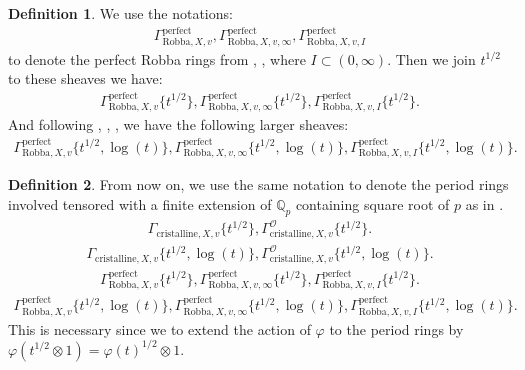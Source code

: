 \documentclass[12pt]{book}
\theoremstyle{definition}
\newtheorem{definition}{Definition}
\begin{document}
\begin{definition}
We use the notations:
\begin{align}
\Gamma^\mathrm{perfect}_{\text{Robba},X,v},\Gamma^\mathrm{perfect}_{\text{Robba},X,v,\infty},\Gamma^\mathrm{perfect}_{\text{Robba},X,v,I}
\end{align}
to denote the perfect Robba rings from \cite{KL1}, \cite{KL2}, where $I\subset (0,\infty)$. Then we join $t^{1/2}$ to these sheaves we have:
\begin{align}
\Gamma^\mathrm{perfect}_{\text{Robba},X,v}\{t^{1/2}\},\Gamma^\mathrm{perfect}_{\text{Robba},X,v,\infty}\{t^{1/2}\},\Gamma^\mathrm{perfect}_{\text{Robba},X,v,I}\{t^{1/2}\}.
\end{align}
And following \cite{BL1}, \cite{BL2}, \cite{Fon1}, \cite{BHS} we have the following larger sheaves:
\begin{align}
\Gamma^\mathrm{perfect}_{\text{Robba},X,v}\{t^{1/2},\log(t)\},\Gamma^\mathrm{perfect}_{\text{Robba},X,v,\infty}\{t^{1/2},\log(t)\},\Gamma^\mathrm{perfect}_{\text{Robba},X,v,I}\{t^{1/2},\log(t)\}.
\end{align} 
\end{definition}



\begin{definition}
From now on, we use the same notation to denote the period rings involved tensored with a finite extension of $\mathbb{Q}_p$ containing square root of $p$ as in \cite{BS}.
\begin{align}
\Gamma_{\text{cristalline},X,v}\{t^{1/2}\},\Gamma^\mathcal{O}_{\text{cristalline},X,v}\{t^{1/2}\}.
\end{align}
\begin{align}
\Gamma_{\text{cristalline},X,v}\{t^{1/2},\log(t)\},\Gamma^\mathcal{O}_{\text{cristalline},X,v}\{t^{1/2},\log(t)\}.
\end{align}
\begin{align}
\Gamma^\mathrm{perfect}_{\text{Robba},X,v}\{t^{1/2}\},\Gamma^\mathrm{perfect}_{\text{Robba},X,v,\infty}\{t^{1/2}\},\Gamma^\mathrm{perfect}_{\text{Robba},X,v,I}\{t^{1/2}\}.
\end{align}
\begin{align}
\Gamma^\mathrm{perfect}_{\text{Robba},X,v}\{t^{1/2},\log(t)\},\Gamma^\mathrm{perfect}_{\text{Robba},X,v,\infty}\{t^{1/2},\log(t)\},\Gamma^\mathrm{perfect}_{\text{Robba},X,v,I}\{t^{1/2},\log(t)\}.
\end{align}
This is necessary since we to extend the action of $\varphi$ to the period rings by $\varphi(t^{1/2}\otimes 1)=\varphi(t)^{1/2}\otimes 1$.
\end{definition}
\end{document}
